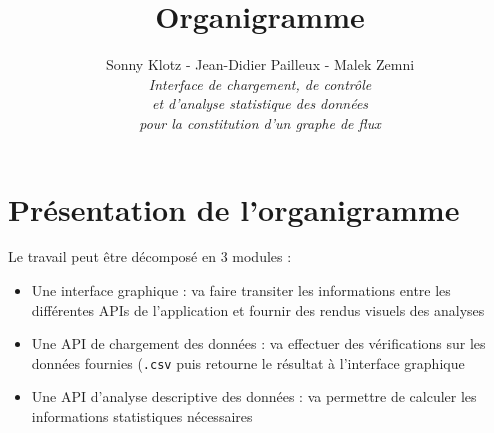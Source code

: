 
\usepackage{tikz}
\usetikzlibrary{arrows,automata}
\usetikzlibrary{positioning}
\geometry{top=3cm,bottom=3cm}

\title{\vspace{\fill}\textbf{\Huge Organigramme}}
\author{Sonny Klotz - Jean-Didier Pailleux - Malek Zemni\vspace{2em}\\\textit{Interface de chargement, de contrôle}\\\textit{et d’analyse statistique des données}\\\textit{pour la constitution d’un graphe de flux}\vspace{2em}}


\maketitle\vspace{\fill}
\newpage
	
	\section{Présentation de l'organigramme}
		Le travail peut être décomposé en 3 modules :
		\begin{itemize}
		\item Une interface graphique : va faire transiter les informations entre les différentes APIs de l'application et fournir des rendus visuels des analyses
		\item Une API de chargement des données : va effectuer des vérifications sur les données fournies (\lstinline!.csv! puis retourne le résultat à l'interface graphique
		\item Une API d'analyse descriptive des données : va permettre de calculer les informations statistiques nécessaires
		\end{itemize}
		
